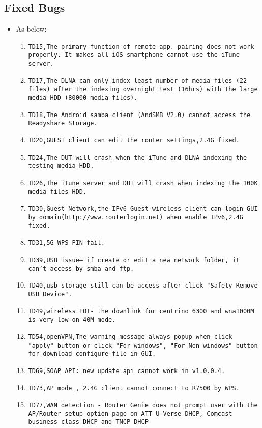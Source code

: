 \documentclass[12pt]{report}
\begin{document}
    \subsection{Fixed Bugs}
    \begin{itemize}
    \item As below:
    	\begin{enumerate}
		\item \texttt{TD15,The primary function of remote app. pairing does not work properly. It makes all iOS smartphone cannot use the iTune server.}
		\item \texttt{TD17,The DLNA can only index least number of media files (22 files) after the indexing overnight test (16hrs) with the large media HDD (80000 media files).}
		\item \texttt{TD18,The Android samba client (AndSMB V2.0) cannot access the Readyshare Storage.}
		\item \texttt{TD20,GUEST client can edit the router settings,2.4G fixed.}
		\item \texttt{TD24,The DUT will crash when the iTune and DLNA indexing the testing media HDD.}
		\item \texttt{TD26,The iTune server and DUT will crash when indexing the 100K media files HDD.}
		\item \texttt{TD30,Guest Network,the IPv6 Guest wireless client can login GUI by domain(http://www.routerlogin.net) when enable IPv6,2.4G fixed.}
		\item \texttt{TD31,5G WPS PIN fail.}
		\item \texttt{TD39,USB issue-- if create or edit a new network folder, it can't access by smba and ftp.}
		\item \texttt{TD40,usb storage still can be access after click "Safety Remove USB Device".}
		\item \texttt{TD49,wireless IOT- the downlink for centrino 6300 and wna1000M is very low on 40M mode.}
		\item \texttt{TD54,openVPN,The warning message always popup when click "apply" button or click "For windows", "For Non windows" button for download configure file in GUI.}
		\item \texttt{TD69,SOAP API: new update api cannot work in v1.0.0.4.}
		\item \texttt{TD73,AP mode , 2.4G client cannot connect to R7500 by WPS.}
		\item \texttt{TD77,WAN detection - Router Genie does not prompt user with the AP/Router setup option page on ATT U-Verse DHCP, Comcast business class DHCP and TNCP DHCP}

\end{enumerate}
\end{itemize}
\end{document}
